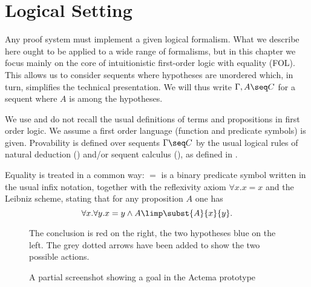 

\section{Logical Setting}

Any proof system must implement a given logical formalism. What we describe here
ought to be applied to a wide range of formalisms, but in this chapter we focus
mainly on the core of intuitionistic first-order logic with equality
(FOL). This allows us to consider sequents where hypotheses are
unordered which, in turn, simplifies the technical presentation. We will thus
write $\Gamma,A \seq C$ for a sequent where $A$ is among the hypotheses.

We use and do not recall the usual definitions of terms and propositions in
first order logic. We assume a first order language (function and predicate
symbols) is given. Provability is defined over sequents $\Gamma\seq C$ by the
usual logical rules of natural deduction () and/or sequent calculus
(), as defined in .

Equality is treated in a common way: $=$ is a binary
predicate symbol written in the usual infix notation, together with the
reflexivity axiom $\forall x.x=x$ and the Leibniz scheme, stating that for any
proposition $A$ one has
$$\forall x.\forall y. x=y\land A \limp \subst{A}{x}{y}.$$

\begin{figure*}
 \begin{center}
 \end{center}
 \caption{A partial screenshot showing a goal in the Actema prototype}
 The conclusion is red on the right, the two hypotheses blue on the left. The
   grey dotted arrows have been added to show the two possible actions.
 \end{figure*}

